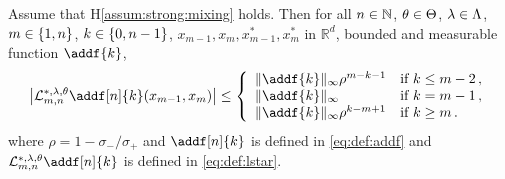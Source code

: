 \documentclass{article}
\begin{document}
\begin{lemma} \label{lem:geo:bound}
Assume that H\ref{assum:strong:mixing} holds. Then for all $n \in \mathbb{N}$, $\theta\in\Theta$, $\lambda\in\Lambda$, $m \in \{ 1, n \}$, $k \in \{ 0, n - 1 \}$, $x_{m-1},x_m, x^*_{m-1},x^*_m$ in $\mathbb{R}^d$, bounded and measurable function $\addf{k}$, 
$$
\left|\mathcal{L}^{*,\parvar,\parvec}_{m, n}\addf[n]{k}(x_{m-1},x_m) \right| \leq 
\left\{
    \begin{array}{ll}
        \| \addf{k} \|_\infty \rho^{m - k - 1}& \mbox{if } k\leq m-2\,, \\
        \| \addf{k} \|_\infty & \mbox{if } k = m-1\,, \\
         \| \addf{k} \|_\infty \rho^{k-m+1}& \mbox{if } k\geq m\,.
    \end{array}
\right.
$$
where $\rho = 1 - \sigma_-/\sigma_+$ and $\addf[n]{k}$ is defined in \eqref{eq:def:addf} and $\mathcal{L}^{*,\parvar,\parvec}_{m, n}\addf[n]{k}$ is defined in \eqref{eq:def:lstar}.
\end{lemma}
\end{document}
